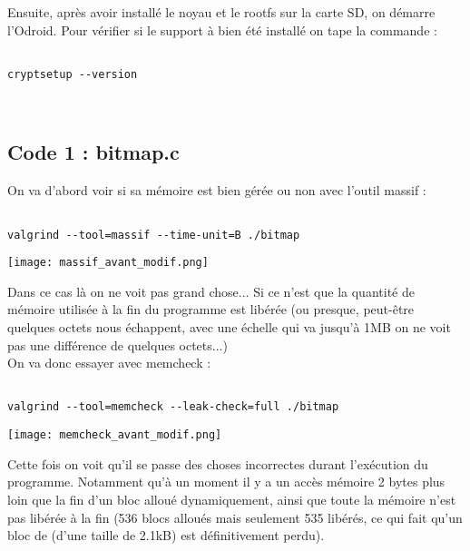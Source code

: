 Ensuite, après avoir installé le noyau et le rootfs sur la carte SD, on démarre l'Odroid. Pour vérifier si le support à bien été installé on tape la commande : 
\begin{lstlisting}[frame=single,style=Console]  % Start your code-block

cryptsetup --version
\end{lstlisting}\\

\subsection{Code 1 : bitmap.c}
On va d'abord voir si sa mémoire est bien gérée ou non avec l'outil massif :
\begin{lstlisting}[frame=single,style=Console]  % Start your code-block

valgrind --tool=massif --time-unit=B ./bitmap
\end{lstlisting}

\begin{center} 
\hspace{15cm}
\texttt{[image: massif\_avant\_modif.png]}
\end{center}
\vspace{0.5cm}
Dans ce cas là on ne voit pas grand chose... Si ce n'est que la quantité de mémoire utilisée à la fin du programme est libérée (ou presque, peut-être quelques octets nous échappent, avec une échelle qui va jusqu'à 1MB on ne voit pas une différence de quelques octets...)\\

On va donc essayer avec memcheck :
\begin{lstlisting}[frame=single,style=Console]  % Start your code-block

valgrind --tool=memcheck --leak-check=full ./bitmap
\end{lstlisting}
\begin{center} 
\hspace{15cm}
\texttt{[image: memcheck\_avant\_modif.png]}
\end{center}
\vspace{0.5cm}
Cette fois on voit qu'il se passe des choses incorrectes durant l'exécution du programme. Notamment qu'à un moment il y a un accès mémoire 2 bytes plus loin que la fin d'un bloc alloué dynamiquement, ainsi que toute la mémoire n'est pas libérée à la fin (536 blocs alloués mais seulement 535 libérés, ce qui fait qu'un bloc de (d'une taille de 2.1kB) est définitivement perdu).\\


